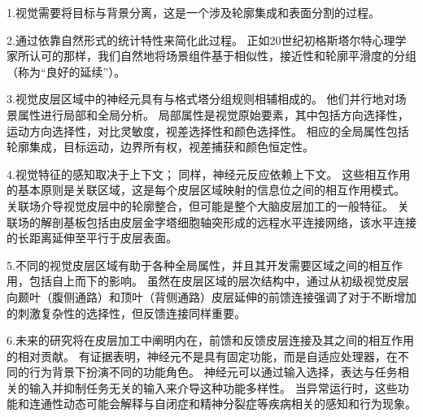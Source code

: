 1.视觉需要将目标与背景分离，这是一个涉及轮廓集成和表面分割的过程。 


2.通过依靠自然形式的统计特性来简化此过程。
正如20世纪初格斯塔尔特心理学家所认可的那样，我们自然地将场景组件基于相似性，接近性和轮廓平滑度的分组（称为“良好的延续”）。


3.视觉皮层区域中的神经元具有与格式塔分组规则相辅相成的。
他们并行地对场景属性进行局部和全局分析。
局部属性是视觉原始要素，其中包括方向选择性，运动方向选择性，对比灵敏度，视差选择性和颜色选择性。
相应的全局属性包括轮廓集成，目标运动，边界所有权，视差捕获和颜色恒定性。


4.视觉特征的感知取决于上下文；
同样，神经元反应依赖上下文。
这些相互作用的基本原则是关联区域，这是每个皮层区域映射的信息位之间的相互作用模式。
关联场介导视觉皮层中的轮廓整合，但可能是整个大脑皮层加工的一般特征。
关联场的解剖基板包括由皮层金字塔细胞轴突形成的远程水平连接网络，该水平连接的长距离延伸至平行于皮层表面。 


5.不同的视觉皮层区域有助于各种全局属性，并且其开发需要区域之间的相互作用，包括自上而下的影响。
虽然在皮层区域的层次结构中，通过从初级视觉皮层向颞叶（腹侧通路）和顶叶（背侧通路）皮层延伸的前馈连接强调了对于不断增加的刺激复杂性的选择性，但反馈连接同样重要。 


6.未来的研究将在皮层加工中阐明内在，前馈和反馈皮层连接及其之间的相互作用的相对贡献。
有证据表明，神经元不是具有固定功能，而是自适应处理器，在不同的行为背景下扮演不同的功能角色。
神经元可以通过输入选择，表达与任务相关的输入并抑制任务无关的输入来介导这种功能多样性。
当异常运行时，这些功能和连通性动态可能会解释与自闭症和精神分裂症等疾病相关的感知和行为现象。

